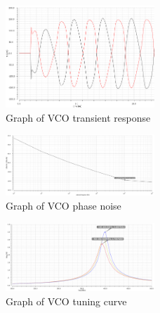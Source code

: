 \begin{figure}[h]
   \centering
    \includegraphics[width=0.5\textwidth]{figures/VCOTrans.png}
    \caption{Graph of VCO transient response}
    \label{fig:vcotrans}
\end{figure}

\begin{figure}[h]
   \centering
    \includegraphics[width=0.5\textwidth]{figures/VCOPhaseNoise.png}
    \caption{Graph of VCO phase noise}
    \label{fig:vcophase}
\end{figure}

\begin{figure}[h]
   \centering
    \includegraphics[width=0.5\textwidth]{figures/VCOTuning.png}
    \caption{Graph of VCO tuning curve}
    \label{fig:vcotune}
\end{figure}